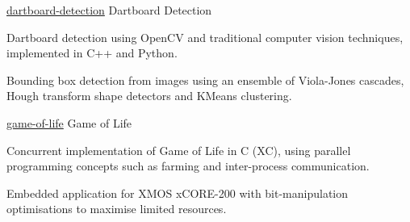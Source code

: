 \begin{cvprojects}
    
\cvproject
    {\href{https://github.com/kaihulme/dartboard-detection}{\faGithubSquare\acvHeaderIconSep dartboard-detection}} %
    {Dartboard Detection} %
    {\begin{cvitems}
        \item {Dartboard detection using OpenCV and traditional computer vision techniques, implemented in C++ and Python.}
        \item {Bounding box detection from images using an ensemble of Viola-Jones cascades, Hough transform shape detectors and KMeans clustering.}
      \end{cvitems}
    }
    
\cvproject
    {{\href{https://github.com/kaihulme/game-of-life}{\faGithubSquare\acvHeaderIconSep game-of-life}}} %
    {Game of Life} %
    {\begin{cvitems}
        \item {Concurrent implementation of Game of Life in C (XC), using parallel programming concepts such as farming and inter-process communication.}
        \item{Embedded application for XMOS xCORE-200 with bit-manipulation optimisations to maximise limited resources.}
      \end{cvitems}
    }
    


\end{cvprojects}
